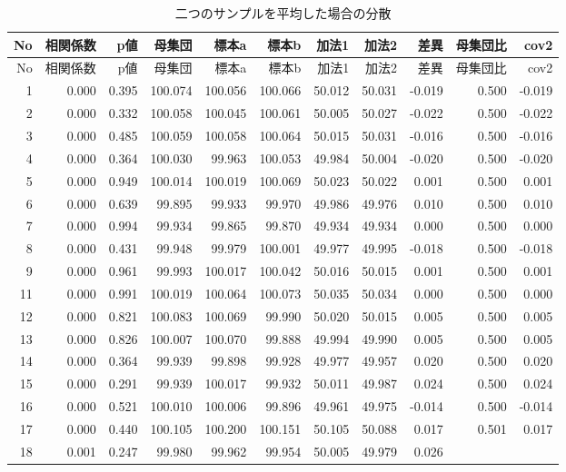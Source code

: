 \documentclass[]{tufte-handout}
\begin{document}
\begin{longtable}[]{@{}rrrrrrrrrrr@{}}
\caption{二つのサンプルを平均した場合の分散}\tabularnewline
\toprule
No & 相関係数 & p値 & 母集団 & 標本a & 標本b & 加法1 & 加法2 & 差異 &
母集団比 & cov2 \\
\midrule
\endfirsthead
\toprule
No & 相関係数 & p値 & 母集団 & 標本a & 標本b & 加法1 & 加法2 & 差異 &
母集団比 & cov2 \\
\midrule
\endhead
1 & 0.000 & 0.395 & 100.074 & 100.056 & 100.066 & 50.012 & 50.031 &
-0.019 & 0.500 & -0.019 \\
2 & 0.000 & 0.332 & 100.058 & 100.045 & 100.061 & 50.005 & 50.027 &
-0.022 & 0.500 & -0.022 \\
3 & 0.000 & 0.485 & 100.059 & 100.058 & 100.064 & 50.015 & 50.031 &
-0.016 & 0.500 & -0.016 \\
4 & 0.000 & 0.364 & 100.030 & 99.963 & 100.053 & 49.984 & 50.004 &
-0.020 & 0.500 & -0.020 \\
5 & 0.000 & 0.949 & 100.014 & 100.019 & 100.069 & 50.023 & 50.022 &
0.001 & 0.500 & 0.001 \\
6 & 0.000 & 0.639 & 99.895 & 99.933 & 99.970 & 49.986 & 49.976 & 0.010 &
0.500 & 0.010 \\
7 & 0.000 & 0.994 & 99.934 & 99.865 & 99.870 & 49.934 & 49.934 & 0.000 &
0.500 & 0.000 \\
8 & 0.000 & 0.431 & 99.948 & 99.979 & 100.001 & 49.977 & 49.995 & -0.018
& 0.500 & -0.018 \\
9 & 0.000 & 0.961 & 99.993 & 100.017 & 100.042 & 50.016 & 50.015 & 0.001
& 0.500 & 0.001 \\
11 & 0.000 & 0.991 & 100.019 & 100.064 & 100.073 & 50.035 & 50.034 &
0.000 & 0.500 & 0.000 \\
12 & 0.000 & 0.821 & 100.083 & 100.069 & 99.990 & 50.020 & 50.015 &
0.005 & 0.500 & 0.005 \\
13 & 0.000 & 0.826 & 100.007 & 100.070 & 99.888 & 49.994 & 49.990 &
0.005 & 0.500 & 0.005 \\
14 & 0.000 & 0.364 & 99.939 & 99.898 & 99.928 & 49.977 & 49.957 & 0.020
& 0.500 & 0.020 \\
15 & 0.000 & 0.291 & 99.939 & 100.017 & 99.932 & 50.011 & 49.987 & 0.024
& 0.500 & 0.024 \\
16 & 0.000 & 0.521 & 100.010 & 100.006 & 99.896 & 49.961 & 49.975 &
-0.014 & 0.500 & -0.014 \\
17 & 0.000 & 0.440 & 100.105 & 100.200 & 100.151 & 50.105 & 50.088 &
0.017 & 0.501 & 0.017 \\
18 & 0.001 & 0.247 & 99.980 & 99.962 & 99.954 & 50.005 & 49.979 & 0.026

\end{longtable}
\end{document}
